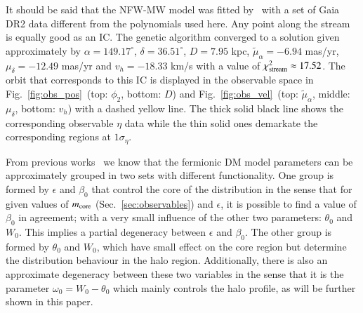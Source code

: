 \documentclass[twocolumn]{aa}
\begin{document}
It should be said that the NFW-MW model was fitted by~\citet{2019MNRAS.486.2995M} with a set of Gaia
DR2 data different from the polynomials used here. Any point along the stream is equally good as an IC. The genetic algorithm converged to a solution given approximately by
$\alpha=149.17^{\circ}$, $\delta=36.51^{\circ}$, $D=7.95$ kpc, $\tilde{\mu}_\alpha=-6.94$ mas/yr, $\mu_\delta=-12.49$ mas/yr and $v_h=-18.33$ km/s with a value of $\chi^2_{\rm{stream}}\approx 17.52$.
The orbit that corresponds to this IC is displayed in the observable space in Fig.~\ref{fig:obs_pos}~(top: $\phi_2$, bottom: $D$) and Fig.~\ref{fig:obs_vel}~(top: $\tilde{\mu}_\alpha$, middle: $\mu_\delta$, bottom: $v_h$) with a dashed yellow line. The thick solid black line shows the corresponding observable $\eta$ data
while the thin solid ones demarkate the corresponding regions at $1\sigma_\eta$.

From previous works~\citep{arguelles_novel_2018,2019PDU....24..278A,2023ApJ...945....1K} we know that the fermionic DM model parameters can be approximately grouped in two sets with different functionality. One group is formed
by $\epsilon$ and $\beta_0$ that control the core of the distribution in the sense that
for given values of $m_{\rm{core}}$ (Sec.~\ref{sec:observables}) and $\epsilon$, it is possible to find a value of $\beta_0$ in agreement; with a very small influence of the other two parameters: $\theta_0$ and $W_0$. This implies a partial degeneracy between $\epsilon$ and $\beta_0$.
The other group is formed by $\theta_0$ and $W_0$, which have small effect on the core region but
determine the distribution behaviour in the halo region. Additionally, there is also an approximate
degeneracy between these two variables in the sense that it is the parameter
$\omega_0 = W_0-\theta_0$ which mainly controls the halo profile, as will be further shown in this paper.
\end{document}
